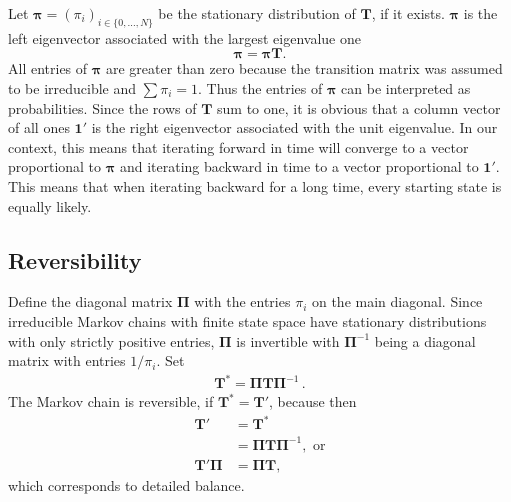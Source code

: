 \documentclass[preprint]{elsarticle}
\newcommand{\bs}[1]{\ensuremath{\boldsymbol{#1}}}
\newcommand\given{{\,|\,}}
\newcommand\ie{{\it i.e.,}}
\newcommand\x[1]{\ensuremath{X_{#1}}}
\newcommand\oneC{\ensuremath{\mathbf{1}'}}
\newcommand\oneR{\ensuremath{\mathbf{1}}}
\begin{document}
Let $\bs{\pi} = (\pi_i)_{i \in \{0,\ldots,N\}}$ be the stationary distribution of $\mathbf{T}$, if it exists. $\bs{\pi}$ is the left eigenvector associated with the largest eigenvalue one~\citep[][p. 87]{Ewen04}
\begin{equation}\label{eq:stationary}
\bs{\pi}=\bs{\pi}\mathbf{T}.
\end{equation}
All entries of $\bs{\pi}$ are greater than zero because the transition matrix was assumed to be irreducible and $\sum \pi_i = 1$. Thus the entries of $\bs{\pi}$ can be interpreted as probabilities. Since the rows of $\mathbf{T}$ sum to one, it is obvious that a column vector of all ones $\oneC$ is the right eigenvector associated with the unit eigenvalue. In our context, this means that iterating forward in time will converge to a vector proportional to $\bs{\pi}$ and iterating backward in time to a vector proportional to $\oneC$. %
This means that when iterating backward for a long time, every starting state is equally likely.

\subsection{Reversibility}

Define the diagonal matrix $\mathbf{\Pi}$ with the entries $\pi_i$ on the main diagonal. Since irreducible Markov chains with finite state space have stationary distributions with only strictly positive entries, $\mathbf{\Pi}$ is invertible with $\mathbf{\Pi}^{-1}$ being a diagonal matrix with entries $1/\pi_i$.  Set
\begin{equation}\label{eq:reverse_transition}
\begin{split}
\mathbf{T}^{*}=\mathbf{\Pi}\mathbf{T}\mathbf{\Pi}^{-1}\,.
\end{split}
\end{equation}
The Markov chain is reversible, if $\mathbf{T}^{*}=\mathbf{T}'$, because then
\begin{align}\label{eq:detailed_balance}
  \mathbf{T}' &= \mathbf{T}^{*} \\
             &= \mathbf{\Pi}\mathbf{T}\mathbf{\Pi}^{-1}, \text{ or} \\
  \mathbf{T}'\mathbf{\Pi} &= \mathbf{\Pi T},
\end{align}
which corresponds to detailed balance.
\end{document}
